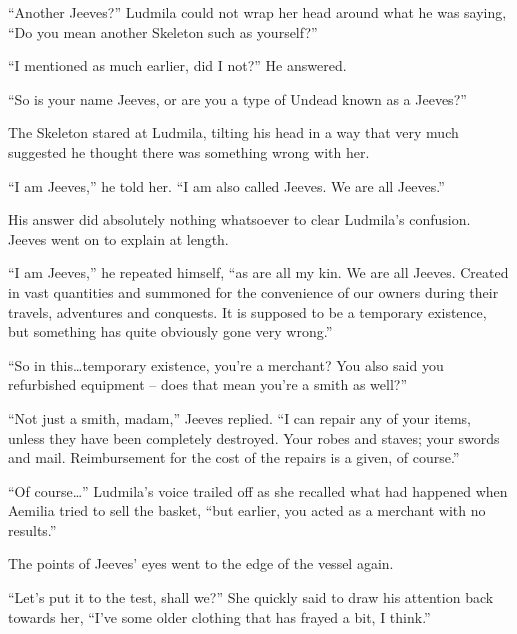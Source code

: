  

“Another Jeeves?” Ludmila could not wrap her head around what he was saying, “Do you mean another Skeleton such as yourself?”

 

“I mentioned as much earlier, did I not?” He answered.

 

“So is your name Jeeves, or are you a type of Undead known as a Jeeves?”

 

The Skeleton stared at Ludmila, tilting his head in a way that very much suggested he thought there was something wrong with her.

 

“I am Jeeves,” he told her. “I am also called Jeeves. We are all Jeeves.”

 

His answer did absolutely nothing whatsoever to clear Ludmila’s confusion. Jeeves went on to explain at length.

 

“I am Jeeves,” he repeated himself, “as are all my kin. We are all Jeeves. Created in vast quantities and summoned for the convenience of our owners during their travels, adventures and conquests. It is supposed to be a temporary existence, but something has quite obviously gone very wrong.”

 

“So in this…temporary existence, you’re a merchant? You also said you refurbished equipment – does that mean you’re a smith as well?”

 

“Not just a smith, madam,” Jeeves replied. “I can repair any of your items, unless they have been completely destroyed. Your robes and staves; your swords and mail. Reimbursement for the cost of the repairs is a given, of course.”

 

“Of course…” Ludmila’s voice trailed off as she recalled what had happened when Aemilia tried to sell the basket, “but earlier, you acted as a merchant with no results.”

 

The points of Jeeves’ eyes went to the edge of the vessel again.

 

“Let’s put it to the test, shall we?” She quickly said to draw his attention back towards her, “I’ve some older clothing that has frayed a bit, I think.”

